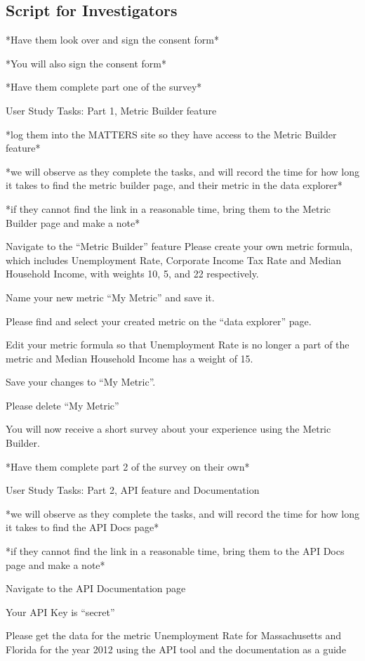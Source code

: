 \subsection{Script for Investigators}

*Have them look over and sign the consent form*

*You will also sign the consent form*

*Have them complete part one of the survey*

User Study Tasks: Part 1, Metric Builder feature

*log them into the MATTERS site so they have access to the Metric Builder feature*

*we will observe as they complete the tasks, and will record the time for how long it takes to find the metric builder page, and their metric in the data explorer*

*if they cannot find the link in a reasonable time, bring them to the Metric Builder page and make a note*

Navigate to the “Metric Builder” feature
Please create your own metric formula, which includes Unemployment Rate, Corporate Income Tax Rate and Median Household Income, with weights 10, 5, and 22 respectively.

Name your new metric “My Metric” and save it.

Please find and select your created metric on the “data explorer” page.

Edit your metric formula so that Unemployment Rate is no longer a part of the metric and Median Household Income  has a weight of 15.

Save your changes to “My Metric”.

Please delete “My Metric”

You will now receive a short survey about your experience using the Metric Builder.

*Have them complete part 2 of the survey on their own*

User Study Tasks: Part 2, API feature and Documentation

*we will observe as they complete the tasks, and will record the time for how long it takes to find the API Docs page*

*if they cannot find the link in a reasonable time, bring them to the API Docs page and make a note*

Navigate to the API Documentation page

Your API Key is “secret”

Please get the data for the metric Unemployment Rate for Massachusetts and Florida for the year 2012 using the API tool and the documentation as a guide

